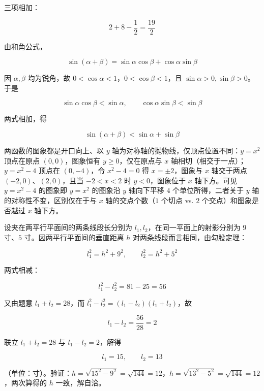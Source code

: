 \begin{answer}
三项相加：

\nopagebreak[4]
\[
2+8-\frac12=\frac{19}2
\]


由和角公式，

\nopagebreak[4]
\[
\sin(\alpha+\beta)=\sin\alpha\cos\beta+\cos\alpha\sin\beta
\]

因 $\alpha,\beta$ 均为锐角，故 $0<\cos\alpha<1$，$0<\cos\beta<1$，且 $\sin\alpha>0,\sin\beta>0$。于是

\nopagebreak[4]
\[
\sin\alpha\cos\beta<\sin\alpha,\qquad \cos\alpha\sin\beta<\sin\beta
\]

两式相加，得

\nopagebreak[4]
\[
\sin(\alpha+\beta)<\sin\alpha+\sin\beta
\]


两函数的图象都是开口向上、以 $y$ 轴为对称轴的抛物线，仅顶点位置不同：$y=x^2$ 顶点在原点 $(0,0)$，图象恒有 $y\ge0$，仅在原点与 $x$ 轴相切（相交于一点）；$y=x^2-4$ 顶点在 $(0,-4)$，令 $x^2-4=0$ 得 $x=\pm2$，图象与 $x$ 轴交于两点 $(-2,0)$、$(2,0)$，且当 $-2<x<2$ 时 $y<0$，图象位于 $x$ 轴下方。可见 $y=x^2-4$ 的图象即 $y=x^2$ 的图象沿 $y$ 轴向下平移 $4$ 个单位所得，二者关于 $y$ 轴的对称性不变，区别仅在于与 $x$ 轴的交点个数（$1$ 个切点 vs. $2$ 个交点）和图象是否越过 $x$ 轴下方。


设夹在两平行平面间的两条线段长分别为 $l_1,l_2$，在同一平面上的射影分别为 $9$ 寸、$5$ 寸。因两平行平面间的垂直距离 $h$ 对两条线段而言相同，由勾股定理：

\nopagebreak[4]
\[
l_1^2=h^2+9^2,\qquad l_2^2=h^2+5^2
\]

两式相减：

\nopagebreak[4]
\[
l_1^2-l_2^2=81-25=56
\]

又由题意 $l_1+l_2=28$，而 $l_1^2-l_2^2=(l_1-l_2)(l_1+l_2)$，故

\nopagebreak[4]
\[
l_1-l_2=\frac{56}{28}=2
\]

联立 $l_1+l_2=28$ 与 $l_1-l_2=2$，解得

\nopagebreak[4]
\[
l_1=15,\qquad l_2=13
\]

（单位：寸）。验证：$h=\sqrt{15^2-9^2}=\sqrt{144}=12$，$h=\sqrt{13^2-5^2}=\sqrt{144}=12$，两次算得的 $h$ 一致，解自洽。






\end{answer}
